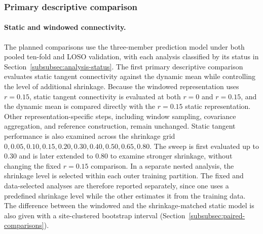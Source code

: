 \subsubsection{Primary descriptive comparison}
\label{subsubsec:primary-comparisons}

\paragraph{\textbf{Static and windowed connectivity.}}
\label{par:static-windowed}
The planned comparisons use the three-member prediction model under both pooled ten-fold and LOSO validation, with each analysis classified by its status in Section~\ref{subsubsec:analysis-status}. The first primary descriptive comparison evaluates static tangent connectivity against the dynamic mean while controlling the level of additional shrinkage. Because the windowed representation uses $r=0.15$, static tangent connectivity is evaluated at both $r=0$ and $r=0.15$, and the dynamic mean is compared directly with the $r=0.15$ static representation. Other representation-specific steps, including window sampling, covariance aggregation, and reference construction, remain unchanged. Static tangent performance is also examined across the shrinkage grid ${0,0.05,0.10,0.15,0.20,0.30,0.40,0.50,0.65,0.80}$. The sweep is first evaluated up to 0.30 and is later extended to 0.80 to examine stronger shrinkage, without changing the fixed $r=0.15$ comparison. In a separate nested analysis, the shrinkage level is selected within each outer training partition. The fixed and data-selected analyses are therefore reported separately, since one uses a predefined shrinkage level while the other estimates it from the training data. The difference between the windowed and the shrinkage-matched static model is also given with a site-clustered bootstrap interval (Section~\ref{subsubsec:paired-comparisons}).

